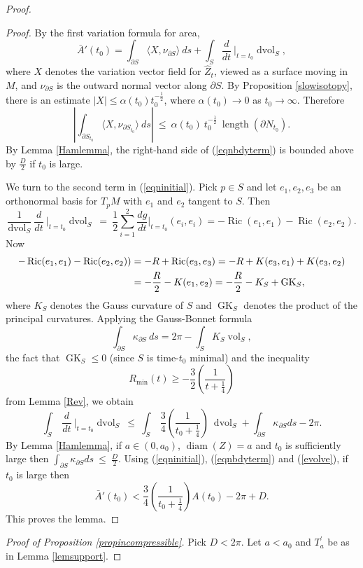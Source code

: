 \documentclass[12pt]{amsart}
\newcommand{\D}{\partial}
\newcommand{\diam}{\operatorname{diam}}
\newcommand{\dvol}{\operatorname{dvol}}
\newcommand{\gk}{\operatorname{GK}}
\newcommand{\length}{\operatorname{length}}
\newcommand{\Ric}{\operatorname{Ric}}
\newcommand{\vol}{\operatorname{vol}}
\newcommand{\ra}{\rightarrow}
\numberwithin{equation}{section}
\theoremstyle{plain}
\theoremstyle{definition}
\theoremstyle{remark}
\begin{document}
\begin{proof}
\begin{proof}
By the first variation formula for area, 
\begin{equation}
\label{eqninitial}
\bar A'(t_0)=\int_{\D S}\langle X,\nu_{\D S}\rangle\:ds
+\int_S\frac{d}{dt} \: \Big|_{t=t_0} \dvol_S,
\end{equation}
where $X$ denotes the variation vector field for $\hat Z_t$, viewed
as a surface moving in $M$, and
$\nu_{\D S}$ is the outward normal vector along $\D S$.
By Proposition \ref{slowisotopy}, there is an estimate $|X|\leq \alpha(t_0)t_0^{-\frac12}$,    
where $\alpha(t_0)\ra 0$ as $t_0 \ra \infty$.
Therefore
\begin{equation}
\label{eqnbdyterm}
\left|\int_{\D S_{t_0}}\langle X,\nu_{\D S_{t_0}}\rangle\:ds\right| \:
\leq \: \alpha(t_0) \: t_0^{-\frac12} \: \length(\D N_{t_0}).
\end{equation}
By Lemma \ref{Hamlemma}, the right-hand side of (\ref{eqnbdyterm})
is bounded above by $\frac{D}{2}$ if $t_0$ is large.

We turn to the second term in (\ref{eqninitial}).  Pick $p\in S$
and let $e_1,e_2,e_3$ be an orthonormal basis for $T_pM$ with
$e_1$ and $e_2$ tangent to $S$.  Then 
\begin{equation}
\frac{1}{\dvol_S} \: \frac{d}{dt} \: \Big|_{t=t_0} \dvol_S \: = \: \frac12 
\sum_{i=1}^2 \frac{dg}{dt} \Big|_{t=t_0} (e_i, e_i)
= -\Ric(e_1,e_1)-\Ric(e_2,e_2).
\end{equation}
Now
\begin{align}
-\Ric(e_1,e_1)-\Ric(e_2,e_2)) & =-R+\Ric(e_3,e_3) 
=-R+K(e_3,e_1)+K(e_3,e_2) \\
& =-\frac{R}{2}-K(e_1,e_2)
=-\frac{R}{2}-K_S+\gk_S, \notag
\end{align}
where $K_S$ denotes the Gauss curvature of $S$ and $\gk_S$
denotes the product of the principal curvatures.  Applying the Gauss-Bonnet formula
\begin{equation}
\int_{\D S}\kappa_{\D S}\:ds=2\pi-\int_S K_S\vol_S,
\end{equation}
the fact that $\gk_S\leq 0$
(since $S$ is time-$t_0$ minimal)
and the inequality 
\begin{equation}
R_{\min}(t)\geq -\frac{3}{2}\left(\frac{1}{t+\frac14}\right)
\end{equation}
from Lemma \ref{Rev}, we obtain
\begin{equation} \label{evolve}
\int_S\:\frac{d}{dt} \: \Big|_{t=t_0} \dvol_S \: \le \:
\int_S\:\frac34\left(\frac{1}{t_0+\frac14}\right) \: \dvol_S+\int_{\D S}\kappa_{\D S}ds-2\pi.
\end{equation}
By Lemma \ref{Hamlemma}, if $a \in (0,a_0)$, $\diam(Z) = a$ and $t_0$ is
sufficiently large then
$\int_{\D S}\kappa_{\D S}ds \: \le \: \frac{D}{2}$.
Using (\ref{eqninitial}), (\ref{eqnbdyterm}) and (\ref{evolve}),
if $t_0$ is large then
\begin{equation}
\bar A'(t_0)< \frac34\left(\frac{1}{t_0+\frac14}\right)A(t_0)-2\pi+D.
\end{equation}
This proves the lemma.
\end{proof}
\noindent
{\em Proof of Proposition \ref{propincompressible}.}
Pick $D<2\pi$. Let $a<a_0$ and $T^\prime_a$ be as in Lemma 
\ref{lemsupport}.


\end{proof}
\end{document}
